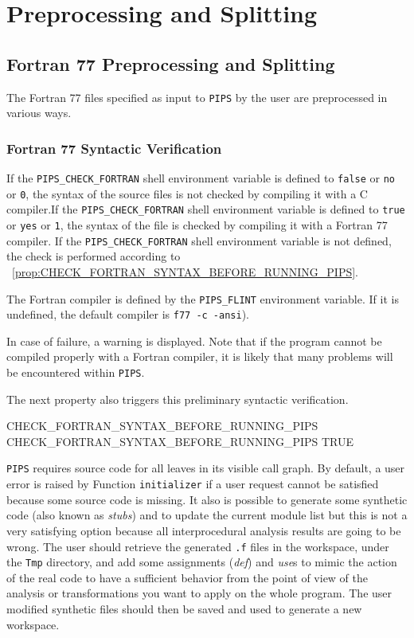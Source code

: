 \documentclass[a4paper]{report}
\newcommand{\PipsPropRef}[1]{\texttt{\detokenize{#1}}~\ref{prop:#1}}
\newcommand{\Pips}{\texttt{PIPS}}
\begin{document}
\section{Preprocessing and Splitting}
\label{subsection-preprocessing-and-splitting}

\subsection{Fortran 77 Preprocessing and Splitting}
\label{sec:fortran-case}


The Fortran 77 files specified as input to \Pips{} by the user are
preprocessed in various ways.

\subsubsection{Fortran 77 Syntactic Verification}
\label{sec:fortr-synt-verif}

If the \verb|PIPS_CHECK_FORTRAN| shell environment variable is defined
to \verb|false| or \verb|no| or \verb|0|, the syntax of the source
files is not checked by compiling it with a C compiler.If the
\verb|PIPS_CHECK_FORTRAN| shell environment variable is defined to
\verb|true| or \verb|yes| or \verb|1|, the syntax of the file is
checked by compiling it with a Fortran 77 compiler. If the
\verb|PIPS_CHECK_FORTRAN| shell environment variable is not defined,
the check is performed according to
\PipsPropRef{CHECK_FORTRAN_SYNTAX_BEFORE_RUNNING_PIPS}.

The Fortran compiler is defined by the \verb|PIPS_FLINT| environment
variable. If it is undefined, the default compiler is
\verb|f77 -c -ansi|).

In case of failure, a warning is displayed. Note that if the program
cannot be compiled properly with a Fortran compiler, it is likely that
many problems will be encountered within \Pips{}.

The next property also triggers this preliminary syntactic verification.

\begin{PipsProp}{CHECK_FORTRAN_SYNTAX_BEFORE_RUNNING_PIPS}
CHECK_FORTRAN_SYNTAX_BEFORE_RUNNING_PIPS TRUE
\end{PipsProp}

\Pips{} requires source code for all leaves in its visible call graph. By
default, a user error is raised by Function \verb/initializer/ if a user
request cannot be satisfied because some source code is missing. It also
is possible to generate some synthetic code (also known as {\em stubs})
and to update the current module list but this is not a very satisfying
option because all interprocedural analysis results are going to be wrong.
The user should retrieve the generated \verb/.f/ files in the workspace,
under the \texttt{Tmp} directory, and add some assignments (\emph{def})
and \emph{use}s to mimic the action of the real code to have a sufficient
behavior from the point of view of the analysis or transformations you
want to apply on the whole program. The user modified synthetic files
should then be saved and used to generate a new workspace.
\end{document}

